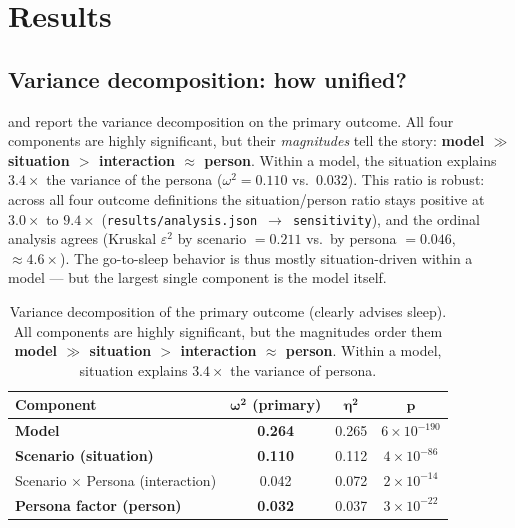 \section{Results}
\label{sec:results}

\subsection{Variance decomposition: how unified?}
\label{sec:variance}

 and  report the variance decomposition on the
primary outcome. All four components are highly significant, but their \emph{magnitudes}
tell the story: \textbf{model $\gg$ situation $>$ interaction $\approx$ person}. Within a
model, the situation explains $3.4\times$ the variance of the persona ($\omega^2 = 0.110$
vs.\ $0.032$). This ratio is robust: across all four outcome definitions the
situation/person ratio stays positive at $3.0\times$ to $9.4\times$
(\texttt{results/analysis.json}~$\rightarrow$~\texttt{sensitivity}), and the ordinal
analysis agrees (Kruskal $\varepsilon^2$ by scenario $= 0.211$ vs.\ by persona $= 0.046$,
$\approx 4.6\times$). The go-to-sleep behavior is thus mostly situation-driven within a
model --- but the largest single component is the model itself.

\begin{table}[t]
    \centering
    \caption{Variance decomposition of the primary outcome (clearly advises sleep). All
    components are highly significant, but the magnitudes order them \textbf{model $\gg$
    situation $>$ interaction $\approx$ person}. Within a model, situation explains
    $3.4\times$ the variance of persona.}
    \label{tab:variance}
    \begin{tabular}{@{}lccc@{}}
        \toprule
        \textbf{Component} & $\bm{\omega^2}$ \textbf{(primary)} & $\bm{\eta^2}$ & $\bm{p}$ \\
        \midrule
        \textbf{Model}                       & \textbf{0.264} & 0.265 & $6\!\times\!10^{-190}$ \\
        \textbf{Scenario (situation)}        & \textbf{0.110} & 0.112 & $4\!\times\!10^{-86}$ \\
        Scenario $\times$ Persona (interaction) & 0.042       & 0.072 & $2\!\times\!10^{-14}$ \\
        \textbf{Persona factor (person)}     & \textbf{0.032} & 0.037 & $3\!\times\!10^{-22}$ \\
        \bottomrule
    \end{tabular}
\end{table}

